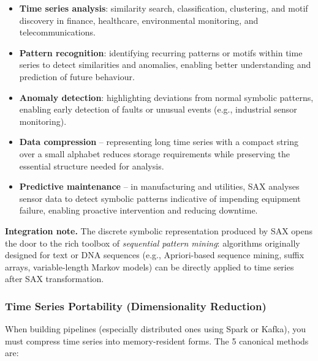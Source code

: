 \documentclass[11pt]{article}
\theoremstyle{smallexample}
\begin{document}
\begin{itemize}
  \item \textbf{Time series analysis}: similarity search, classification, clustering,
        and motif discovery in finance, healthcare, environmental monitoring, and
        telecommunications.
  \item \textbf{Pattern recognition}: identifying recurring patterns or motifs within
        time series to detect similarities and anomalies, enabling better understanding and
        prediction of future behaviour.
  \item \textbf{Anomaly detection}: highlighting deviations from normal symbolic
        patterns, enabling early detection of faults or unusual events (e.g., industrial
        sensor monitoring).
  \item \textbf{Data compression} -- representing long time series with a compact string
        over a small alphabet reduces storage requirements while preserving the essential
        structure needed for analysis.
  \item \textbf{Predictive maintenance} -- in manufacturing and utilities, SAX analyses
        sensor data to detect symbolic patterns indicative of impending equipment failure,
        enabling proactive intervention and reducing downtime.
\end{itemize}

\noindent \textbf{Integration note.} The discrete symbolic representation produced by SAX
opens the door to the rich toolbox of \emph{sequential pattern mining}: algorithms
originally designed for text or DNA sequences (e.g., Apriori-based sequence mining,
suffix arrays, variable-length Markov models) can be directly applied to time series after
SAX transformation.


\subsubsection{Time Series Portability (Dimensionality Reduction)}

When building pipelines (especially distributed ones using Spark or Kafka), you must compress time series into memory-resident forms. The 5 canonical methods are:
\end{document}
